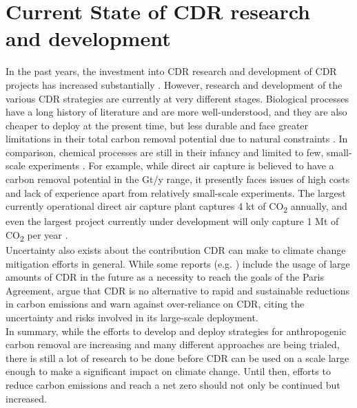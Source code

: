 \section{Current State of CDR research and development}
In the past years, the investment into CDR research and development of CDR projects has increased substantially \parencite[11]{Smith2023TheEdition}. However, research and development of the various CDR strategies are currently at very different stages. Biological processes have a long history of literature and are more well-understood, and they are also cheaper to deploy at the present time, but less durable and face greater limitations in their total carbon removal potential due to natural constraints \parencite{Fuss2018NegativeEffects}. In comparison, chemical processes are still in their infancy and limited to few, small-scale experiments \parencite[24]{Smith2023TheEdition}. For example, while direct air capture is believed to have a carbon removal potential in the Gt/y range, it presently faces issues of high costs and lack of experience apart from relatively small-scale experiments. The largest currently operational direct air capture plant captures 4 kt of CO\textsubscript{2} annually, and even the largest project currently under development will only capture 1 Mt of CO\textsubscript{2} per year \parencite{Pernot2022DirectNeeded}. \\
Uncertainty also exists about the contribution CDR can make to climate change mitigation efforts in general. While some reports (e.g. \textcite{NationalAcademiesofSciences2018NegativeAgenda}) include the usage of large amounts of CDR in the future as a necessity to reach the goals of the Paris Agreement, \textcite{Fuss2018NegativeEffects} argue that CDR is no alternative to rapid and sustainable reductions in carbon emissions and warn against over-reliance on CDR, citing the uncertainty and risks involved in its large-scale deployment.\\
In summary, while the efforts to develop and deploy strategies for anthropogenic carbon removal are increasing and many different approaches are being trialed, there is still a lot of research to be done before CDR can be used on a scale large enough to make a significant impact on climate change. Until then, efforts to reduce carbon emissions and reach a net zero should not only be continued but increased.
